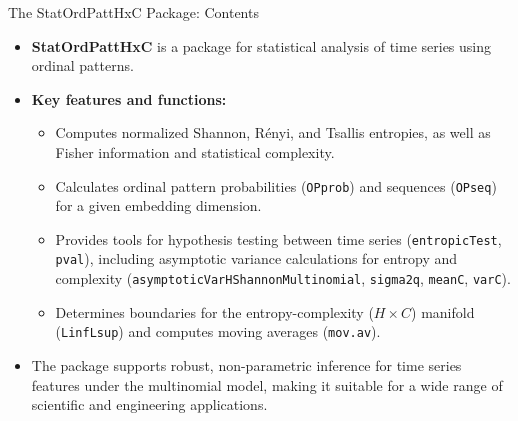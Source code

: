 \documentclass{beamer}
\begin{document}
\begin{frame}{The StatOrdPattHxC Package: Contents}
	\begin{itemize}
		\item \textbf{StatOrdPattHxC} is a package for statistical analysis of time series using ordinal patterns.
		\item \textbf{Key features and functions:}
		\begin{itemize}
			\item Computes normalized Shannon, Rényi, and Tsallis entropies, as well as Fisher information and statistical complexity.
			\item Calculates ordinal pattern probabilities (\texttt{OPprob}) and sequences (\texttt{OPseq}) for a given embedding dimension.
			\item Provides tools for hypothesis testing between time series (\texttt{entropicTest}, \texttt{pval}), including asymptotic variance calculations for entropy and complexity (\texttt{asymptoticVarHShannonMultinomial}, \texttt{sigma2q}, \texttt{meanC}, \texttt{varC}).
			\item Determines boundaries for the entropy-complexity ($H \times C$) manifold (\texttt{LinfLsup}) and computes moving averages (\texttt{mov.av}).
		\end{itemize}
		\item The package supports robust, non-parametric inference for time series features under the multinomial model, making it suitable for a wide range of scientific and engineering applications.
	\end{itemize}
\end{frame}
\end{document}
